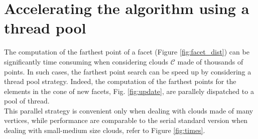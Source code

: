 \documentclass{article}
\begin{document}
\section{Accelerating the algorithm using a thread pool}

The computation of the farthest point of a facet (Figure \ref{fig:facet_dist}) can be significantly time consuming when considering clouds $\mathcal{C}$ made of thousands of points. In such cases, the farthest point search can be speed up by considering a thread pool strategy.
Indeed, the computation of the farthest points for the elements in the cone of new facets, Fig. \ref{fig:update}, are parallely dispatched to a pool of thread.
\\
This parallel strategy is convenient only when dealing with clouds made of many vertices, while performance are comparable to the serial standard version when dealing with small-medium size clouds, refer to Figure \ref{fig:times}.
\end{document}
